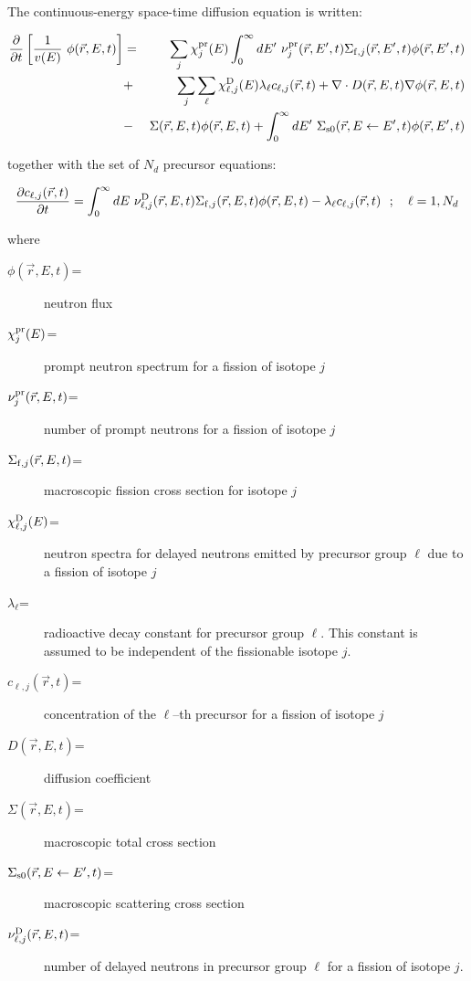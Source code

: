 \vskip 0.2cm

The continuous-energy space-time diffusion equation is written:

\begin{eqnarray}
\nonumber {\partial\over \partial t}\left[ {1 \over v(E)} \ \phi(\vec r,E,t)\right] &=&
\sum_j \chi_j^{\rm pr}(E)\int_0^\infty dE' \ \nu_j^{\rm pr}(\vec r,E',t)\Sigma_{{\rm f},j}(\vec r,E',t)
\phi(\vec r,E',t)\\
\nonumber &+&\sum_j\sum_\ell\chi_{\ell,j}^{\rm D}(E)\lambda_\ell c_{\ell,j}(\vec r,t) + \nabla \cdot D(\vec r,E,t) \nabla\phi(\vec r,E,t)\\
&-& \Sigma(\vec r,E,t) \phi(\vec r,E,t) + \int_0^\infty dE' \ \Sigma_{\rm s0}(\vec r,E \leftarrow E',t)
\phi(\vec r,E',t)
\label{eq:eq1}
\end{eqnarray}

\noindent together with the set of $N_d$ precursor equations:

\begin{equation}
{\partial c_{\ell,j}(\vec r,t) \over \partial t}=\int_0^\infty dE \ \nu_{\ell,j}^{\rm D}(\vec r,E,t)
\Sigma_{{\rm f},j}(\vec r,E,t) \phi(\vec r,E,t)-\lambda_\ell c_{\ell,j}(\vec r,t) \ \ ; \ \ \
\ell=1,N_d
\label{eq:eq2}
\end{equation}

\noindent where
\begin{description}
\item [$\phi(\vec r,E,t)$=] neutron flux
\item [$\chi_j^{\rm pr}(E)$=] prompt neutron spectrum for a fission of isotope $j$
\item [$\nu_j^{\rm pr}(\vec r,E,t)$=] number of prompt neutrons for a fission of isotope $j$
\item [$\Sigma_{{\rm f},j}(\vec r,E,t)$=] macroscopic fission cross section for isotope $j$
\item [$\chi_{\ell,j}^{\rm D}(E)$=] neutron spectra for delayed neutrons emitted by precursor group $\ell$
due to a fission of isotope $j$
\item [$\lambda_\ell$=] radioactive decay constant for precursor group $\ell$. This
constant is assumed to be independent of the fissionable isotope $j$.
\item [$c_{\ell,j}(\vec r,t)$=] concentration of the $\ell$--th precursor for a fission of isotope $j$
\item [$D(\vec r,E,t)$=] diffusion coefficient
\item [$\Sigma(\vec r,E,t)$=] macroscopic total cross section
\item [$\Sigma_{\rm s0}(\vec r,E \leftarrow E',t)$=] macroscopic scattering cross section
\item [$\nu_{\ell,j}^{\rm D}(\vec r,E,t)$=] number of delayed neutrons in precursor group $\ell$ for a fission of isotope $j$.
\end{description}

